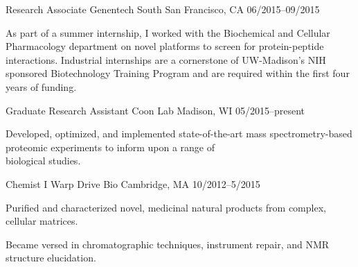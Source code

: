 

\begin{cventries}

  \cventry
    {Research Associate} %
    {Genentech} %
    {South San Francisco, CA} %
    {06/2015--09/2015} %
    {
      \begin{cvitems} %
        \item {As part of a summer internship, I worked with the Biochemical and Cellular Pharmacology department on novel platforms to screen for protein-peptide interactions. Industrial internships are a cornerstone of UW-Madison's NIH sponsored Biotechnology Training Program and are required within the first four years of funding.}
      \end{cvitems}
    } 
  
  
  \cventry
    {Graduate Research Assistant} %
    {Coon Lab} %
    {Madison, WI} %
    {05/2015--present} %
    {
      \begin{cvitems} %
        \item {Developed, optimized, and implemented state-of-the-art mass spectrometry-based proteomic experiments to inform upon a range of \\biological studies.}
      \end{cvitems}
    }
    
      \cventry
    {Chemist I} %
    {Warp Drive Bio} %
    {Cambridge, MA} %
    {10/2012--5/2015} %
    {
      \begin{cvitems} %
        \item {Purified and characterized novel, medicinal natural products from complex, cellular matrices.}
        \item {Became versed in chromatographic techniques, instrument repair, and NMR structure elucidation.}
      \end{cvitems}
    }
    

\end{cventries}
